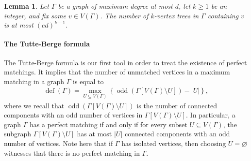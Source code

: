 \documentclass[notitlepage]{scrartcl}
\newtheorem{lemma}[thm]{Lemma}
\newcommand{\defi}{\operatorname{def}}
\newcommand{\odd}{\operatorname{odd}}
\begin{document}
\begin{lemma}\label{lem:rooted-trees}
Let $\Gamma$ be a graph of maximum degree at most $d$, let $k\ge1$ be an integer, and fix some $v\in V(\Gamma)$.
The number of $k$-vertex trees in $\Gamma$ containing $v$ is at most $(ed)^{k-1}$.
\end{lemma}


\paragraph{The Tutte-Berge formula}

The Tutte-Berge formula \cite{B62} is our first tool in order to treat the existence of perfect matchings. It implies that the number of unmatched vertices in a maximum matching in a graph $\Gamma$ is equal to 
\begin{align} \label{eq:Tutte-Berge}
    \defi(\Gamma)= \max_{U\subseteq V(\Gamma)} \left\{\odd\left(\Gamma[V(\Gamma)\setminus U]\right)- |U|\right\},
\end{align}
where we recall that $\odd\left(\Gamma[V(\Gamma)\setminus U]\right)$ is the number of connected components with an odd number of vertices in $\Gamma[V(\Gamma)\setminus U]$. In particular, a graph $\Gamma$ has a perfect matching if and only if for every subset $U\subseteq V(\Gamma)$, the subgraph $\Gamma[V(\Gamma)\setminus U]$ has at most $|U|$ connected components with an odd number of vertices. Note here that if $\Gamma$ has isolated vertices, then choosing $U=\varnothing$ witnesses that there is no perfect matching in $\Gamma$.
\end{document}
